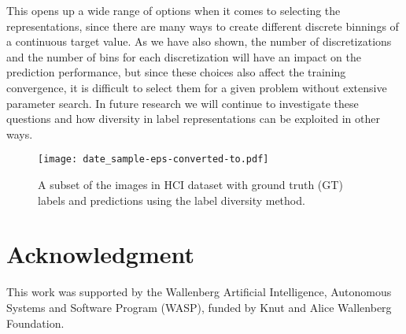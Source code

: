 \documentclass[10pt, conference, a4paper]{IEEEtran}
\begin{document}
This opens up a wide range of options when it comes to selecting the representations, since there are many ways to create different discrete binnings of a continuous target value. As we have also shown, the number of discretizations and the number of bins for each discretization will have an impact on the prediction performance, but since these choices also affect the training convergence, it is difficult to select them for a given problem without extensive parameter search. In future research we will continue to investigate these questions and how diversity in label representations can be exploited in other ways.

\begin{figure}[t]
  \centering
  \texttt{[image: date\_sample-eps-converted-to.pdf]}
  \caption{A subset of the images in HCI dataset \cite{DBLP:conf/eccv/PalermoHE12} with ground truth (GT) labels and predictions using the label diversity method.}
\label{hci_preview}
\end{figure}



\section*{Acknowledgment}
This work was supported by the Wallenberg Artificial Intelligence, Autonomous Systems and Software Program (WASP), funded by Knut and Alice Wallenberg Foundation.










\end{document}
